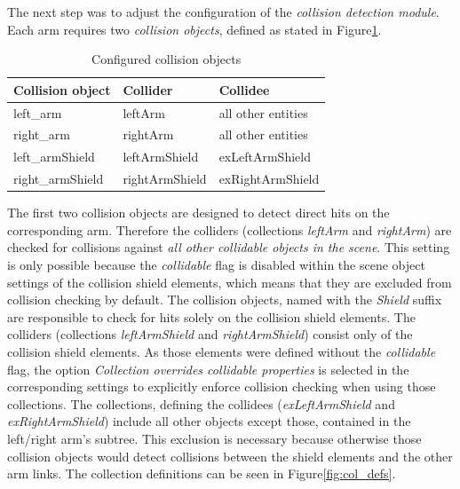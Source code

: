 The next step was to adjust the configuration of the \emph{collision detection module}. Each arm requires two \emph{collision objects}, defined as stated in Figure\ref{fig:col_groups}. 
\begin{table}
  \centering
  \label{fig:col_groups}
  \begin{tabular}[h]{|l|l|l|} \hline
	\textbf{Collision object} & \textbf{Collider} & \textbf{Collidee} \\ \hline
	left\_arm & leftArm & all other entities \\
	right\_arm & rightArm & all other entities \\
	left\_armShield & leftArmShield & exLeftArmShield \\
	right\_armShield & rightArmShield & exRightArmShield \\ \hline
  \end{tabular}
  \caption{Configured collision objects}
\end{table}
The first two collision objects are designed to detect direct hits on the corresponding arm.  
Therefore the colliders (collections \emph{leftArm} and \emph{rightArm}) are checked for collisions against \emph{all other collidable objects in the scene}. This setting is only possible because the \emph{collidable} flag is disabled within the scene object settings of the collision shield elements, which means that they are excluded from collision checking by default. The collision objects, named with the \emph{Shield} suffix are responsible to check for hits solely on the collision shield elements. The colliders (collections \emph{leftArmShield} and \emph{rightArmShield}) consist only of the collision shield elements. As those elements were defined without the \emph{collidable} flag, the option \emph{Collection overrides collidable properties} is selected in the corresponding settings to explicitly enforce collision checking when using those collections. The collections, defining the collidees (\emph{exLeftArmShield} and \emph{exRightArmShield}) include all other objects except those, contained in the left/right arm's subtree. This exclusion is necessary because otherwise those collision objects would detect collisions between the shield elements and the other arm links. The collection definitions can be seen in Figure\ref{fig:col_defs}.
